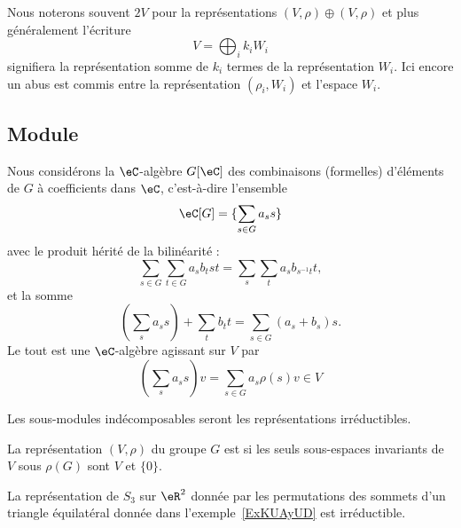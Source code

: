 Nous noterons souvent \( 2V\) pour la représentations \( (V,\rho)\oplus (V,\rho)\) et plus généralement l'écriture
\begin{equation}
	V=\bigoplus_i k_iW_i
\end{equation}
signifiera la représentation somme de \( k_i\) termes de la représentation \( W_i\). Ici encore un abus est commis entre la représentation \( (\rho_i,W_i)\) et l'espace \( W_i\).

\subsection{Module}

Nous considérons la \( \eC\)-algèbre \( G[\eC]\) des combinaisons (formelles) d'éléments de \( G\) à coefficients dans \( \eC\), c'est-à-dire l'ensemble
\begin{equation}
	\eC[G]=\{ \sum_{s\in G}a_ss \}
\end{equation}
avec le produit hérité de la bilinéarité :
\begin{equation}
	\sum_{s\in G}\sum_{t\in G}a_sb_tst=\sum_s\sum_t a_sb_{s^{-1}t}t,
\end{equation}
et la somme
\begin{equation}
	(\sum_sa_ss)+\sum_tb_tt=\sum_{s\in G}(a_s+b_s)s.
\end{equation}
Le tout est une \( \eC\)-algèbre agissant sur \( V\) par
\begin{equation}
	\left( \sum_sa_ss \right)v=\sum_{s\in G}a_s\rho(s)v\in V
\end{equation}

Les sous-modules indécomposables seront les représentations irréductibles.

\begin{definition}
	La représentation \( (V,\rho)\) du groupe \( G\) est  si les seuls sous-espaces invariants de \( V\) sous \( \rho(G)\) sont \( V\) et \( \{ 0 \}\).
\end{definition}

\begin{example}
	La représentation de \( S_3\) sur \( \eR^2\) donnée par les permutations des sommets d'un triangle équilatéral donnée dans l'exemple~\ref{ExKUAyUD} est irréductible.
\end{example}

